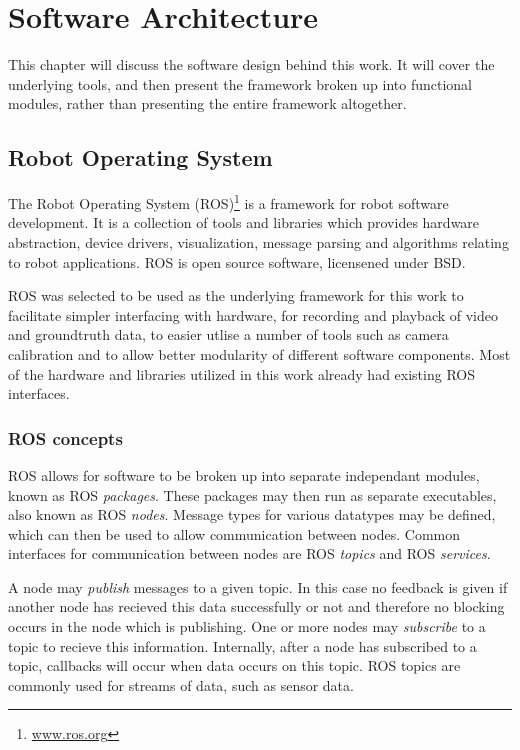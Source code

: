 \chapter{Software Architecture}
\label{chapter:architecture}

This chapter will discuss the software design behind this work.  It will cover the underlying tools, and then present the framework broken up into functional modules, rather than presenting the entire framework altogether.

\section{Robot Operating System}

The Robot Operating System (ROS)\footnote{\url{www.ros.org}} is a framework for robot software development.  It is a collection of tools and libraries which provides hardware abstraction, device drivers, visualization, message parsing and algorithms relating to robot applications.  ROS is open source software, licensened under BSD.

ROS was selected to be used as the underlying framework for this work to facilitate simpler interfacing with hardware, for recording and playback of video and groundtruth data, to easier utlise a number of tools such as camera calibration and to allow better modularity of different software components.  Most of the hardware and libraries utilized in this work already had existing ROS interfaces.

\subsection{ROS concepts}

ROS allows for software to be broken up into separate independant modules, known as ROS \textit{packages}.  These packages may then run as separate executables, also known as ROS \textit{nodes}.  Message types for various datatypes may be defined, which can then be used to allow communication between nodes.  Common interfaces for communication between nodes are ROS \textit{topics} and ROS \textit{services}.

A node may \textit{publish} messages to a given topic.  In this case no feedback is given if another node has recieved this data successfully or not and therefore no blocking occurs in the node which is publishing.  One or more nodes may \textit{subscribe} to a topic to recieve this information.  Internally, after a node has subscribed to a topic, callbacks will occur when data occurs on this topic.  ROS topics are commonly used for streams of data, such as sensor data.

